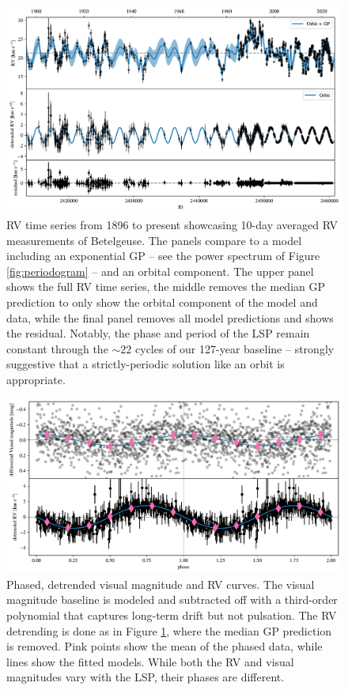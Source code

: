 \documentclass[twocolumn]{aastex631}
\begin{document}
\begin{figure}
    \centering
    \includegraphics[width=\textwidth]{figures/RV_timeseries_model.pdf}
    \caption{ RV time series from 1896 to present showcasing 10-day averaged RV measurements of Betelgeuse. The panels compare to a model including an exponential GP -- see the power spectrum of Figure \ref{fig:periodogram} -- and an orbital component. The upper panel shows the full RV time series, the middle removes the median GP prediction to only show the orbital component of the model and data, while the final panel removes all model predictions and shows the residual.  Notably, the phase and period of the LSP remain constant through the $\sim 22$ cycles of our 127-year baseline -- strongly suggestive that a strictly-periodic solution like an orbit is appropriate. }
    \label{fig:RV}
\end{figure}


\begin{figure}
    \centering
    \includegraphics[width=\textwidth]{figures/phased_lc_rv.pdf}
    \caption{Phased, detrended visual magnitude and RV curves. The visual magnitude baseline is modeled and subtracted off with a third-order polynomial that captures long-term drift but not pulsation. The RV detrending is done as in Figure \ref{fig:RV}, where the median GP prediction is removed.  Pink points show the mean of the phased data, while lines show the fitted models. While both the RV and visual magnitudes vary with the LSP, their phases are different.  }
    \label{fig:phase}
\end{figure}
\end{document}
